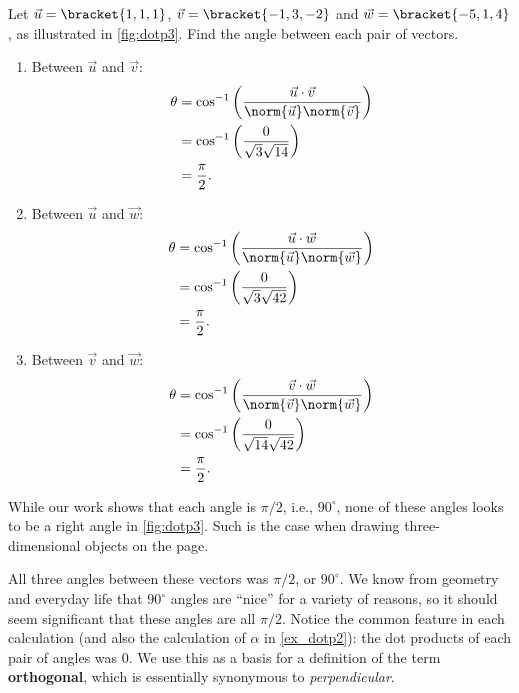 \begin{example}\label{ex_dotp3}
Let $\vec u = \bracket{1,1,1}$, $\vec v = \bracket{-1,3,-2}$ and $\vec w = \bracket{-5,1,4}$, as illustrated in \autoref{fig:dotp3}. Find the angle between each pair of vectors.
\solution
\begin{enumerate}
	\item Between $\vec u$ and $\vec v$:\vspace{-\baselineskip}
	\begin{align*}
		\theta &= \cos^{-1}\left(\frac{\vec u\cdot\vec v}{\norm{\vec u}\norm{\vec v}}\right)\\
		&= \cos^{-1}\left(\frac{0}{\sqrt{3}\sqrt{14}}\right)\\
		&= \frac{\pi}2.
	\end{align*}
	\item	Between $\vec u$ and $\vec w$:\vspace{-\baselineskip}
	\begin{align*}
		\theta &= \cos^{-1}\left(\frac{\vec u\cdot\vec w}{\norm{\vec u}\norm{\vec w}}\right)\\
		&= \cos^{-1}\left(\frac{0}{\sqrt{3}\sqrt{42}}\right)\\
		&= \frac{\pi}2.
	\end{align*}
	\item	Between $\vec v$ and $\vec w$:\vspace{-\baselineskip}
	\begin{align*}
		\theta &= \cos^{-1}\left(\frac{\vec v\cdot\vec w}{\norm{\vec v}\norm{\vec w}}\right)\\
		&= \cos^{-1}\left(\frac{0}{\sqrt{14}\sqrt{42}}\right)\\
		&= \frac{\pi}2.
	\end{align*}
\end{enumerate}
While our work shows that each angle is $\pi/2$, i.e.,  $90^\circ$, none of these angles looks to be a right angle in \autoref{fig:dotp3}. Such is the case when drawing three-dimensional objects on the page.
\end{example}

All three angles between these vectors was $\pi/2$, or $90^\circ$. We know from geometry and everyday life that $90^\circ$ angles are ``nice'' for a variety of reasons, so it should seem significant that these angles are all $\pi/2$. Notice the common feature in each calculation (and also the calculation of $\alpha$ in \autoref{ex_dotp2}): the dot products of each pair of angles was 0. We use this as a basis for a definition of the term \textbf{orthogonal}, which is essentially synonymous to \emph{perpendicular}.

